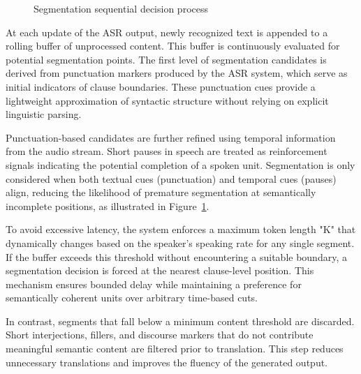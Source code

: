 \begin{figure}[!htbp]
  \centering
  
  \caption[Segmentation sequential decision process]{Segmentation sequential decision process}
  \label{fig:segmentation_flow}
\end{figure}

At each update of the ASR output, newly recognized text is appended to a rolling buffer of unprocessed content. This buffer is continuously evaluated for potential segmentation points. The first level of segmentation candidates is derived from punctuation markers produced by the ASR system, which serve as initial indicators of clause boundaries. These punctuation cues provide a lightweight approximation of syntactic structure without relying on explicit linguistic parsing.

Punctuation-based candidates are further refined using temporal information from the audio stream. Short pauses in speech are treated as reinforcement signals indicating the potential completion of a spoken unit. Segmentation is only considered when both textual cues (punctuation) and temporal cues (pauses) align, reducing the likelihood of premature segmentation at semantically incomplete positions, as illustrated in Figure~\ref{fig:segmentation_flow}.

To avoid excessive latency, the system enforces a maximum token length "K" that dynamically changes based on the speaker's speaking rate for any single segment. If the buffer exceeds this threshold without encountering a suitable boundary, a segmentation decision is forced at the nearest clause-level position. This mechanism ensures bounded delay while maintaining a preference for semantically coherent units over arbitrary time-based cuts.

In contrast, segments that fall below a minimum content threshold are discarded. Short interjections, fillers, and discourse markers that do not contribute meaningful semantic content are filtered prior to translation. This step reduces unnecessary translations and improves the fluency of the generated output.


